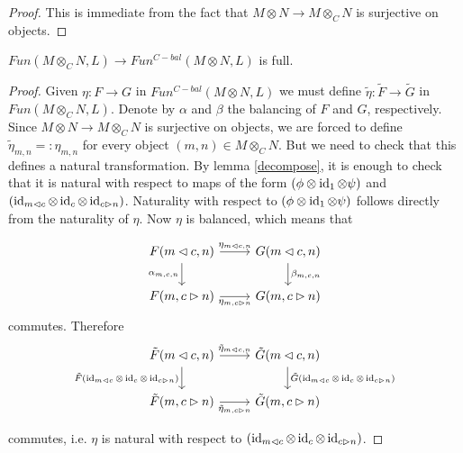 \begin{proof}
  This is immediate from the fact that $M\otimes N \to M\otimes_C N$ is
  surjective on objects.
\end{proof}

\begin{lemma}\label{full}
  $Fun(M\otimes_C N,L)\to Fun^{C-bal}(M\otimes N,L)$ is full.
\end{lemma}

\begin{proof}
  Given $\eta:F\to G$ in $Fun^{C-bal}(M\otimes N,L)$ we must define
  $\tilde{\eta}:\tilde{F}\to\tilde{G}$ in $Fun(M\otimes_C N,L)$. Denote by
  $\alpha$ and $\beta$ the balancing of $F$ and $G$, respectively. Since
  $M\otimes N\to M\otimes_C N$ is surjective on objects, we are forced to
  define $\tilde{\eta}_{m,n}=:\eta_{m,n}$ for every object $(m,n)\in
  M\otimes_C N$. But we need to check that this defines a natural
  transformation. By lemma \ref{decompose}, it is enough to check that it is
  natural with respect to maps of the form $(\phi\otimes\operatorname{id}_1\otimes\psi)$ and
  $(\operatorname{id}_{m\lhd c}\otimes\operatorname{id}_c\otimes\operatorname{id}_{c\rhd n})$. Naturality with respect
  to $(\phi\otimes\operatorname{id}_1\otimes\psi)$ follows directly from the naturality of
  $\eta$. Now $\eta$ is balanced, which means that

  \[
    \begin{tikzcd}
      {F(m\lhd c, n)} & {G(m\lhd c, n)} \\
      {F(m,c\rhd n)} & {G(m,c\rhd n)}
      \arrow["{\eta_{m\lhd c, n}}", from=1-1, to=1-2]
      \arrow["{\alpha_{m,c,n}}"', from=1-1, to=2-1]
      \arrow["{\beta_{m,c,n}}", from=1-2, to=2-2]
      \arrow["{\eta_{m,c\rhd n}}"', from=2-1, to=2-2]
    \end{tikzcd}\]
  commutes. Therefore
  \[
    \begin{tikzcd}
      {\tilde{F}(m\lhd c, n)} & {\tilde{G}(m\lhd c, n)} \\
      {\tilde{F}(m,c\rhd n)} & {\tilde{G}(m,c\rhd n)}
      \arrow["{\tilde{\eta}_{m\lhd c, n}}", from=1-1, to=1-2]
      \arrow["{\tilde{F}(\id_{m\lhd c}\otimes\id_c\otimes\id_{c\rhd n})}"', from=1-1, to=2-1]
      \arrow["{\tilde{G}(\id_{m\lhd c}\otimes\id_c\otimes\id_{c\rhd n})}", from=1-2, to=2-2]
      \arrow["{\tilde{\eta}_{m,c\rhd n}}"', from=2-1, to=2-2]
    \end{tikzcd}
  \]

  \noindent commutes, i.e. $\eta$ is natural with respect to $(\operatorname{id}_{m\lhd
  c}\otimes\operatorname{id}_c\otimes\operatorname{id}_{c\rhd n})$.
\end{proof}

